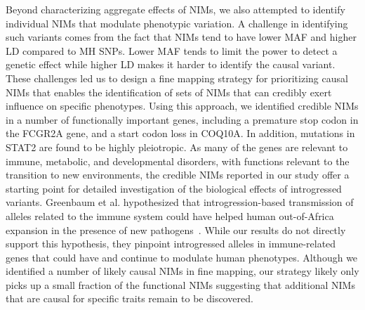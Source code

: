 Beyond characterizing aggregate effects of NIMs, we also attempted to identify individual NIMs that modulate phenotypic variation. A challenge in identifying such variants comes from the fact that NIMs tend to have lower MAF and higher LD compared to MH SNPs. Lower MAF tends to limit the power to detect a genetic effect while higher LD makes it harder to identify the causal variant. These challenges led us to design a fine mapping strategy for prioritizing causal NIMs that enables the identification of sets of NIMs that can credibly exert influence on specific phenotypes. Using this approach, we identified credible NIMs in a number of functionally important genes, including a premature stop codon in the FCGR2A gene, and a start codon loss in COQ10A. In addition, mutations in STAT2 are found to be highly pleiotropic. As many of the genes are relevant to immune, metabolic, and developmental disorders, with functions relevant to the transition to new environments, the credible NIMs reported in our study offer a starting point for detailed investigation of the biological effects of introgressed variants. Greenbaum et al. hypothesized that introgression-based transmission of alleles related to the immune system could have helped human out-of-Africa expansion in the presence of new pathogens~\cite{greenbaum2019disease}. While our results do not directly support this hypothesis, they pinpoint introgressed alleles in immune-related genes that could have and continue to modulate human phenotypes. Although we identified a number of likely causal NIMs in fine mapping, our strategy likely only picks up a small fraction of the functional NIMs suggesting that additional NIMs that are causal for specific traits remain to be discovered. 

